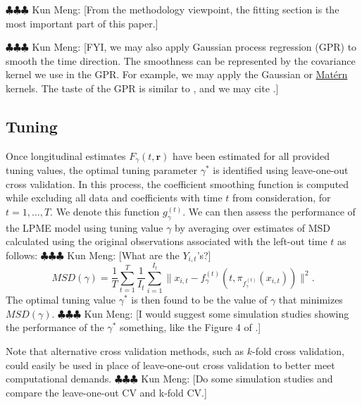 \documentclass[11pt,reqno]{article}
\newcommand{\meng}[1]{{\color{purple} \sf $\clubsuit\clubsuit\clubsuit$ Kun Meng: [#1]}}
\theoremstyle{definition}
\begin{document}
\meng{From the methodology viewpoint, the fitting section is the most important part of this paper.}

\meng{FYI, we may also apply Gaussian process regression (GPR) to smooth the time direction. The smoothness can be represented by the covariance kernel we use in the GPR. For example, we may apply the Gaussian or \href{https://en.wikipedia.org/wiki/Matern_covariance_function}{Matérn} kernels. The taste of the GPR is similar to \cite{dunsonInferringManifoldsNoisy2022}, and we may cite \cite{dunsonInferringManifoldsNoisy2022}.}

\subsection*{Tuning}

Once longitudinal estimates $F_{\gamma}(t, \boldsymbol{r})$ have been estimated for all provided tuning values, the optimal tuning parameter $\gamma^*$ is identified using leave-one-out cross validation. In this process, the coefficient smoothing function is computed while excluding all data and coefficients with time $t$ from consideration, for $t = 1, \dots, T$. We denote this function $g_{\gamma}^{(t)}$. We can then assess the performance of the LPME model using tuning value $\gamma$ by averaging over estimates of MSD calculated using the original observations associated with the left-out time $t$ as follows: \meng{What are the $Y_{i,t}$'s?}
\begin{equation}
  MSD(\gamma) = \frac{1}{T} \sum_{t=1}^{T}\frac{1}{I_t}\sum_{i=1}^{I_t}\|x_{i, t} - f_{\gamma}^{(t)}(t, \pi_{f_{\gamma}^{(t)}}(x_{i, t}))\|^2. \label{eq:18}
\end{equation}
The optimal tuning value $\gamma^*$ is then found to be the value of $\gamma$ that minimizes $MSD(\gamma)$. \meng{I would suggest some simulation studies showing the performance of the $\gamma^*$ something, like the Figure 4 of \cite{mengPrincipalManifoldEstimation2021}.}

Note that alternative cross validation methods, such as $k$-fold cross validation, could easily be used in place of leave-one-out cross validation to better meet computational demands. \meng{Do some simulation studies and compare the leave-one-out CV and k-fold CV.}

\LinesNumbered


\LinesNumbered
\end{document}
